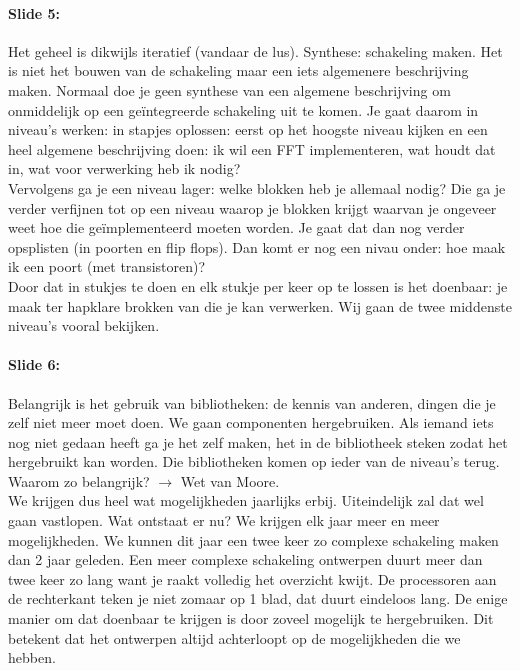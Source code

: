 \documentclass[10pt,a4paper]{book}
\begin{document}
\paragraph{Slide 5:} Het geheel is dikwijls iteratief (vandaar de lus). Synthese: schakeling maken. Het is niet het bouwen van de schakeling maar een iets algemenere beschrijving maken. Normaal doe je geen synthese van een algemene beschrijving om onmiddelijk op een ge\"integreerde schakeling uit te komen. Je gaat daarom in niveau's werken: in stapjes oplossen: eerst op het hoogste niveau kijken en een heel algemene beschrijving doen: ik wil een FFT implementeren, wat houdt dat in, wat voor verwerking heb ik nodig?\\ Vervolgens ga je een niveau lager: welke blokken heb je allemaal nodig? Die ga je verder verfijnen tot op een niveau waarop je blokken krijgt waarvan je ongeveer weet hoe die ge\"implementeerd moeten worden. Je gaat dat dan nog verder opsplisten (in poorten en flip flops). Dan komt er nog een nivau onder: hoe maak ik een poort (met transistoren)? \\
Door dat in stukjes te doen en elk stukje per keer op te lossen is het doenbaar: je maak ter hapklare brokken van die je kan verwerken. Wij gaan de twee middenste niveau's vooral bekijken. 

\paragraph{Slide 6:} Belangrijk is het gebruik van bibliotheken: de kennis van anderen, dingen die je zelf niet meer moet doen. We gaan componenten hergebruiken. Als iemand iets nog niet gedaan heeft ga je het zelf maken, het in de bibliotheek steken zodat het hergebruikt kan worden. Die bibliotheken komen op ieder van de niveau's terug. Waarom zo belangrijk? $\rightarrow$ Wet van Moore.\\
We krijgen dus heel wat mogelijkheden jaarlijks erbij. Uiteindelijk zal dat wel gaan vastlopen. Wat ontstaat er nu? We krijgen elk jaar meer en meer mogelijkheden. We kunnen dit jaar een twee keer zo complexe schakeling maken dan 2 jaar geleden. Een meer complexe schakeling ontwerpen duurt meer dan twee keer zo lang want je raakt volledig het overzicht kwijt. De processoren aan de rechterkant teken je niet zomaar op 1 blad, dat duurt eindeloos lang. De enige manier om dat doenbaar te krijgen is door zoveel mogelijk te hergebruiken. Dit betekent dat het ontwerpen altijd achterloopt op de mogelijkheden die we hebben. 
\end{document}
